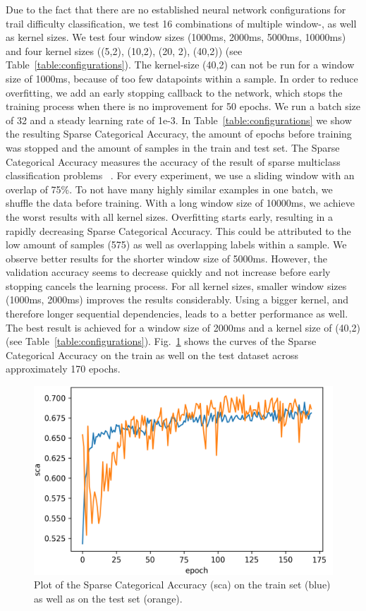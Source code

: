 \documentclass[runningheads]{llncs}
\begin{document}
Due to the fact that there are no established neural network configurations for trail difficulty classification, we test 16 combinations of multiple window-, as well as kernel sizes.
We test four window sizes (1000ms, 2000ms, 5000ms, 10000ms) and four kernel sizes ((5,2), (10,2), (20, 2), (40,2)) (see Table~\ref{table:configurations}).
The kernel-size (40,2) can not be run for a window size of 1000ms, because of too few datapoints within a sample.
In order to reduce overfitting, we add an early stopping callback to the network, which stops the training process when there is no improvement for 50 epochs.
We run a batch size of 32 and a steady learning rate of 1e-3.
In Table~\ref{table:configurations} we show the resulting Sparse Categorical Accuracy, the amount of epochs before training was stopped and the amount of samples in the train and test set.
The Sparse Categorical Accuracy measures the accuracy of the result of sparse multiclass classification problems ~\cite{moolayil2019keras}.
For every experiment, we use a sliding window with an overlap of 75\%.
To not have many highly similar examples in one batch, we shuffle the data before training.
With a long window size of 10000ms, we achieve the worst results with all kernel sizes.
Overfitting starts early, resulting in a rapidly decreasing Sparse Categorical Accuracy.
This could be attributed to the low amount of samples (575) as well as overlapping labels within a sample.
We observe better results for the shorter window size of 5000ms.
However, the validation accuracy seems to decrease quickly and not increase before early stopping cancels the learning process.
For all kernel sizes, smaller window sizes (1000ms, 2000ms) improves the results considerably.
Using a bigger kernel, and therefore longer sequential dependencies, leads to a better performance as well.
The best result is achieved for a window size of 2000ms and a kernel size of (40,2) (see Table~\ref{table:configurations}).
Fig.~\ref{fig4} shows the curves of the Sparse Categorical Accuracy on the train as well on the test dataset across approximately 170 epochs.

\begin{figure}
\vspace{-5mm}
\centering
\includegraphics[width=.8\textwidth]{accuracy_plot.png}
\caption{Plot of the Sparse Categorical Accuracy (sca) on the train set (blue) as well as on the test set (orange).}
\label{fig4}	
\end{figure} 
\end{document}
